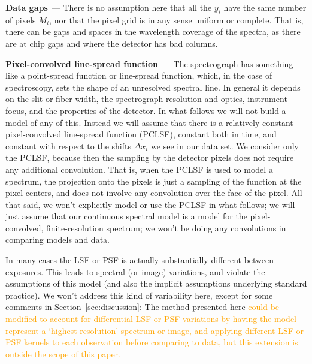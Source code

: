 \documentclass[modern, linenumbers]{aastex631}
\renewcommand{\paragraph}[1]{\medskip\par\noindent\textbf{#1}~---}
\newcommand{\sectionname}{Section}
\newcommand{\secref}[1]{\sectionname~\ref{#1}}
\newcommand{\modified}[1]{\textcolor{orange}{#1}}
\begin{document}
\paragraph{Data gaps}
There is no assumption here that all the $y_i$ have the same number of pixels $M_i$, nor that the pixel grid is in any sense uniform or complete.
That is, there can be gaps and spaces in the wavelength coverage of the spectra, as there are at chip gaps and where the detector has bad columns.

\paragraph{Pixel-convolved line-spread function}
The spectrograph has something like a point-spread function or line-spread function, which, in the case of spectroscopy, sets the shape of an unresolved spectral line.
In general it depends on the slit or fiber width, the spectrograph resolution and optics, instrument focus, and the properties of the detector.
In what follows we will not build a model of any of this.
Instead we will assume that there is a relatively constant pixel-convolved line-spread function (PCLSF), constant both in time, and constant with respect to the shifts $\Delta x_i$ we see in our data set.
We consider only the PCLSF, because then the sampling by the detector pixels does not require any additional convolution.
That is, when the PCLSF is used to model a spectrum, the projection onto the pixels is just a sampling of the function at the pixel centers, and does not involve any convolution over the face of the pixel.
All that said, we won't explicitly model or use the PCLSF in what follows; we will just assume that our continuous spectral model is a model for the pixel-convolved, finite-resolution spectrum; we won't be doing any convolutions in comparing models and data.

In many cases the LSF or PSF is actually substantially different between exposures.
This leads to spectral (or image) variations, and violate the assumptions of this model (and also the implicit assumptions underlying standard practice).
We won't address this kind of variability here, except for some comments in \secref{sec:discussion}:
The method presented here \modified{could be modified to account for differential LSF or PSF variations by having the model represent a `highest resolution' spectrum or image, and applying different LSF or PSF kernels to each observation before comparing to data, but this extension is outside the scope of this paper.}
\end{document}
